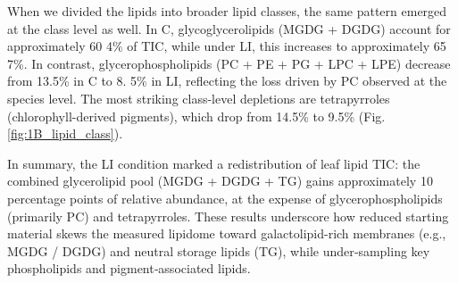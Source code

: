 \documentclass[10pt,letterpaper]{article}
\begin{document}
When we divided the lipids into broader lipid classes, the same pattern emerged at the class level as well. In C, glycoglycerolipids (MGDG + DGDG) account for approximately 60 4\% of TIC, while under LI, this increases to approximately 65 7\%. In contrast, glycerophospholipids (PC + PE + PG + LPC + LPE) decrease from 13.5\% in C to 8. 5\% in LI, reflecting the loss driven by PC observed at the species level. The most striking class-level depletions are tetrapyrroles (chlorophyll-derived pigments), which drop from 14.5\% to 9.5\% (Fig. \ref{fig:1B_lipid_class}).

In summary, the LI condition marked a redistribution of leaf lipid TIC: the combined glycerolipid pool (MGDG + DGDG + TG) gains approximately 10 percentage points of relative abundance, at the expense of glycerophospholipids (primarily PC) and tetrapyrroles. These results underscore how reduced starting material skews the measured lipidome toward galactolipid-rich membranes (e.g., MGDG / DGDG) and neutral storage lipids (TG), while under‐sampling key phospholipids and pigment‐associated lipids.
\end{document}
